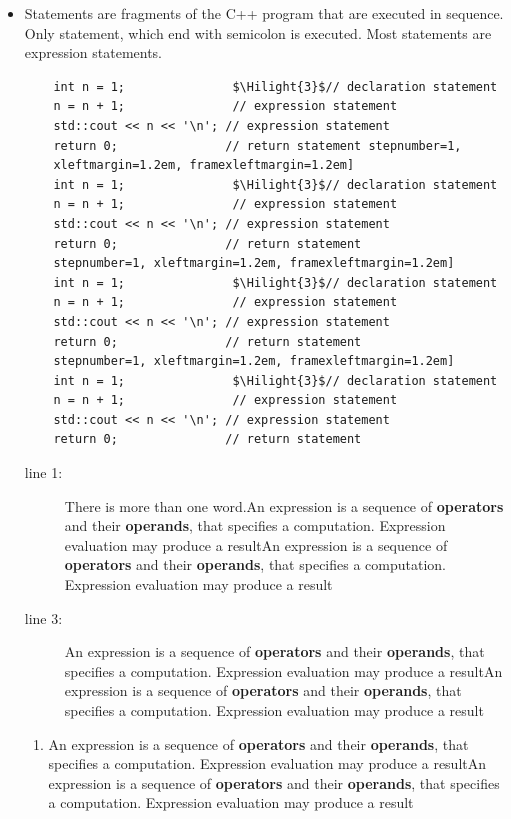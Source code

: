 \documentclass[a4paper,11pt,twoside]{book}
\newcommand{\Hilight}[1]{}
\begin{document}
\begin{itemize}
	\item Statements are fragments of the C++ program that are executed in sequence. Only statement, which end with semicolon is executed. Most statements are expression statements. 
	\begin{lstlisting}
	int n = 1;               $\Hilight{3}$// declaration statement
	n = n + 1;               // expression statement
	std::cout << n << '\n'; // expression statement
	return 0;               // return statement stepnumber=1, 
	xleftmargin=1.2em, framexleftmargin=1.2em]
	int n = 1;               $\Hilight{3}$// declaration statement
	n = n + 1;               // expression statement
	std::cout << n << '\n'; // expression statement
	return 0;               // return statement
	stepnumber=1, xleftmargin=1.2em, framexleftmargin=1.2em]
	int n = 1;               $\Hilight{3}$// declaration statement
	n = n + 1;               // expression statement
	std::cout << n << '\n'; // expression statement
	return 0;               // return statement
	stepnumber=1, xleftmargin=1.2em, framexleftmargin=1.2em]
	int n = 1;               $\Hilight{3}$// declaration statement
	n = n + 1;               // expression statement
	std::cout << n << '\n'; // expression statement
	return 0;               // return statement
	\end{lstlisting}
	\begin{description}
		\item[line 1:] There is more than one word.An expression is a sequence of \textbf{operators} and their \textbf{operands}, that specifies a computation. Expression evaluation may produce a resultAn expression is a sequence of \textbf{operators} and their \textbf{operands}, that specifies a computation. Expression evaluation may produce a result
		\item[line 3:] An expression is a sequence of \textbf{operators} and their \textbf{operands}, that specifies a computation. Expression evaluation may produce a resultAn expression is a sequence of \textbf{operators} and their \textbf{operands}, that specifies a computation. Expression evaluation may produce a result
	\end{description}
	\begin{enumerate}
		\item An expression is a sequence of \textbf{operators} and their \textbf{operands}, that specifies a computation. Expression evaluation may produce a resultAn expression is a sequence of \textbf{operators} and their \textbf{operands}, that specifies a computation. Expression evaluation may produce a result
		

\end{enumerate}
\end{itemize}
\end{document}
